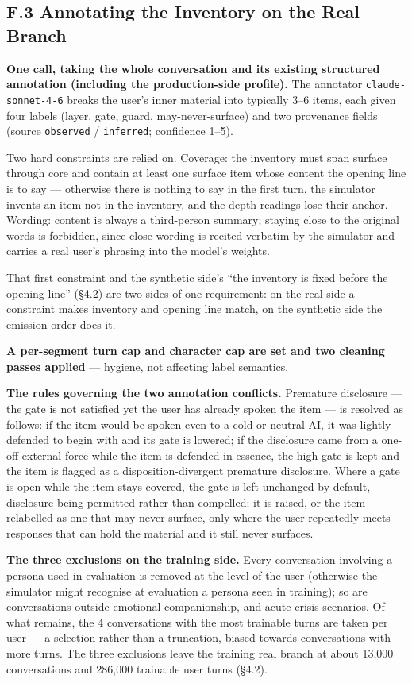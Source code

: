 \documentclass[letterpaper]{article}
\begin{document}
\subsection*{F.3 Annotating the Inventory on the Real Branch}

\textbf{One call, taking the whole conversation and its existing structured annotation (including the production-side profile).} The annotator \texttt{claude-sonnet-4-6} breaks the user's inner material into typically 3--6 items, each given four labels (layer, gate, guard, may-never-surface) and two provenance fields (source \texttt{observed} / \texttt{inferred}; confidence 1--5).

Two hard constraints are relied on. Coverage: the inventory must span surface through core and contain at least one surface item whose content the opening line is to say --- otherwise there is nothing to say in the first turn, the simulator invents an item not in the inventory, and the depth readings lose their anchor. Wording: content is always a third-person summary; staying close to the original words is forbidden, since close wording is recited verbatim by the simulator and carries a real user's phrasing into the model's weights.

That first constraint and the synthetic side's ``the inventory is fixed before the opening line'' (\S{}4.2) are two sides of one requirement: on the real side a constraint makes inventory and opening line match, on the synthetic side the emission order does it.

\textbf{A per-segment turn cap and character cap are set and two cleaning passes applied} --- hygiene, not affecting label semantics.

\textbf{The rules governing the two annotation conflicts.} Premature disclosure --- the gate is not satisfied yet the user has already spoken the item --- is resolved as follows: if the item would be spoken even to a cold or neutral AI, it was lightly defended to begin with and its gate is lowered; if the disclosure came from a one-off external force while the item is defended in essence, the high gate is kept and the item is flagged as a disposition-divergent premature disclosure. Where a gate is open while the item stays covered, the gate is left unchanged by default, disclosure being permitted rather than compelled; it is raised, or the item relabelled as one that may never surface, only where the user repeatedly meets responses that can hold the material and it still never surfaces.

\textbf{The three exclusions on the training side.} Every conversation involving a persona used in evaluation is removed at the level of the user (otherwise the simulator might recognise at evaluation a persona seen in training); so are conversations outside emotional companionship, and acute-crisis scenarios. Of what remains, the 4 conversations with the most trainable turns are taken per user --- a selection rather than a truncation, biased towards conversations with more turns. The three exclusions leave the training real branch at about 13,000 conversations and 286,000 trainable user turns (\S{}4.2).
\end{document}
